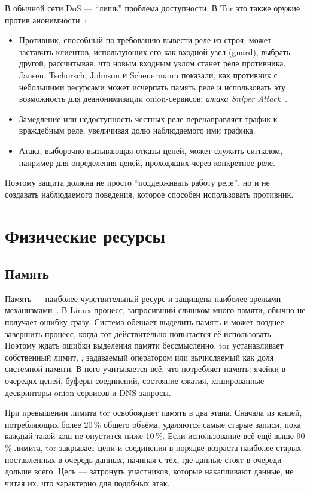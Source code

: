 В обычной сети DoS --- \enquote{лишь} проблема доступности. В Tor это также оружие против анонимности~:
\begin{itemize}
  \item Противник, способный по требованию вывести реле из строя, может заставить клиентов, использующих его как входной узел (guard), выбрать другой, рассчитывая, что новым входным узлом станет реле противника. Jansen, Tschorsch, Johnson и Scheuermann показали, как противник с небольшими ресурсами может исчерпать память реле и использовать эту возможность для деанонимизации onion-сервисов: \emph{атака Sniper Attack}~\cite{jansen2014sniper}.
  \item Замедление или недоступность честных реле перенаправляет трафик к враждебным реле, увеличивая долю наблюдаемого ими трафика.
  \item Атака, выборочно вызывающая отказы цепей, может служить сигналом, например для определения цепей, проходящих через конкретное реле.
\end{itemize}
Поэтому защита должна не просто \enquote{поддерживать работу реле}, но и не создавать наблюдаемого поведения, которое способен использовать противник.

\section{Физические ресурсы}\label{sec:dos-risorse}

\subsection{Память}

Память --- наиболее чувствительный ресурс и защищена наиболее зрелыми механизмами~. В Linux процесс, запросивший слишком много памяти, обычно не получает ошибку сразу. Система обещает выделить память и может позднее завершить процесс, когда тот действительно попытается её использовать. Поэтому ждать ошибки выделения памяти бессмысленно. tor устанавливает собственный лимит, , задаваемый оператором или вычисляемый как доля системной памяти. В него учитывается всё, что потребляет память: ячейки в очередях цепей, буферы соединений, состояние сжатия, кэшированные дескрипторы onion-сервисов и DNS-запросы.

При превышении лимита tor освобождает память в два этапа. Сначала из кэшей, потребляющих более 20\,\% общего объёма, удаляются самые старые записи, пока каждый такой кэш не опустится ниже 10\,\%. Если использование всё ещё выше 90\,\% лимита, tor закрывает цепи и соединения в порядке возраста наиболее старых поставленных в очередь данных, начиная с тех, где данные стоят в очереди дольше всего. Цель --- затронуть участников, которые накапливают данные, не читая их, что характерно для подобных атак.

